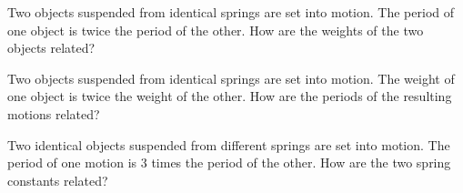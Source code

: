 \documentclass{ximera}
\begin{document}
\begin{problem}\label{exer:6.1.19}
Two objects suspended from identical springs are set into
motion.  The period of one object is twice the period of the other.
How are the weights of the two objects related?
\end{problem}

\begin{problem}\label{exer:6.1.20}
Two objects suspended from identical springs are set into motion. The
weight of one object is twice the weight of the other. How are the
periods of the resulting motions related?
\end{problem}

\begin{problem}\label{exer:6.1.21}
Two identical objects suspended from different springs are set into
motion. The period of one motion is 3 times the period of the
other. How are the two spring constants related?
\end{problem}
\end{document}
